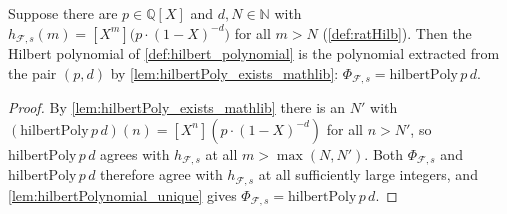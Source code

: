 \begin{corollary}\leanok
  \label{cor:hilbertPolynomial_eq_hilbertPoly}
  Suppose there are \(p \in \mathbb{Q}[X]\) and \(d, N \in \mathbb{N}\) with
  \(h_{\mathcal{F},s}(m) = [X^m]\bigl(p \cdot (1-X)^{-d}\bigr)\) for all
  \(m > N\) (\cref{def:ratHilb}). Then the Hilbert polynomial of
  \cref{def:hilbert_polynomial} is the polynomial extracted from the pair
  \((p, d)\) by \cref{lem:hilbertPoly_exists_mathlib}:
  \(\Phi_{\mathcal{F},s} = \mathrm{hilbertPoly}\,p\,d\).
\end{corollary}

\begin{proof}
  \leanok
  By \cref{lem:hilbertPoly_exists_mathlib} there is an \(N'\) with
  \((\mathrm{hilbertPoly}\,p\,d)(n) = [X^n](p\cdot(1-X)^{-d})\) for all
  \(n > N'\), so \(\mathrm{hilbertPoly}\,p\,d\) agrees with
  \(h_{\mathcal{F},s}\) at all \(m > \max(N, N')\). Both
  \(\Phi_{\mathcal{F},s}\) and \(\mathrm{hilbertPoly}\,p\,d\) therefore agree
  with \(h_{\mathcal{F},s}\) at all sufficiently large integers, and
  \cref{lem:hilbertPolynomial_unique} gives
  \(\Phi_{\mathcal{F},s} = \mathrm{hilbertPoly}\,p\,d\).
\end{proof}

